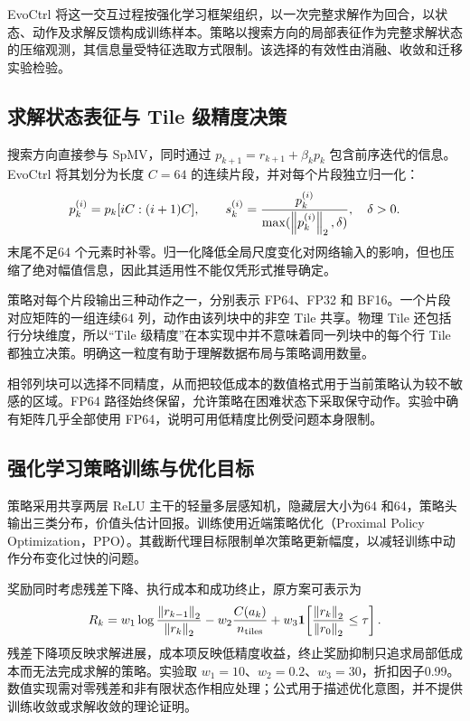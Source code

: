 EvoCtrl 将这一交互过程按强化学习框架组织，以一次完整求解作为回合，以状态、动作及求解反馈构成训练样本。策略以搜索方向的局部表征作为完整求解状态的压缩观测，其信息量受特征选取方式限制。该选择的有效性由消融、收敛和迁移实验检验。

\subsection{求解状态表征与 Tile 级精度决策}
搜索方向直接参与 SpMV，同时通过 $p_{k+1}=r_{k+1}+\beta_kp_k$ 包含前序迭代的信息。EvoCtrl 将其划分为长度 $C=64$ 的连续片段，并对每个片段独立归一化：
\begin{equation}
 p_k^{(i)}=p_k[iC:(i+1)C],\qquad
 s_k^{(i)}=\frac{p_k^{(i)}}{\max(\left\lVert p_k^{(i)}\right\rVert_2,\delta)},\quad\delta>0.
 \label{eq:evo-state}
\end{equation}
末尾不足64 个元素时补零。归一化降低全局尺度变化对网络输入的影响，但也压缩了绝对幅值信息，因此其适用性不能仅凭形式推导确定。

策略对每个片段输出三种动作之一，分别表示 FP64、FP32 和 BF16。一个片段对应矩阵的一组连续64 列，动作由该列块中的非空 Tile 共享。物理 Tile 还包括行分块维度，所以“Tile 级精度”在本实现中并不意味着同一列块中的每个行 Tile 都独立决策。明确这一粒度有助于理解数据布局与策略调用数量。

相邻列块可以选择不同精度，从而把较低成本的数值格式用于当前策略认为较不敏感的区域。FP64 路径始终保留，允许策略在困难状态下采取保守动作。实验中确有矩阵几乎全部使用 FP64，说明可用低精度比例受问题本身限制。

\subsection{强化学习策略训练与优化目标}
策略采用共享两层 ReLU 主干的轻量多层感知机，隐藏层大小为64 和64，策略头输出三类分布，价值头估计回报。训练使用近端策略优化（Proximal Policy Optimization，PPO）\cite{schulman2017}。其截断代理目标限制单次策略更新幅度，以减轻训练中动作分布变化过快的问题。

奖励同时考虑残差下降、执行成本和成功终止，原方案可表示为
\begin{equation}
 R_k=w_1\log\frac{\left\lVert r_{k-1}\right\rVert_2}{\left\lVert r_k\right\rVert_2}
 -w_2\frac{C(a_k)}{n_{\mathrm{tiles}}}
 +w_3\mathbf{1}\!\left[\frac{\left\lVert r_k\right\rVert_2}{\left\lVert r_0\right\rVert_2}\leq\tau\right].
 \label{eq:evo-reward}
\end{equation}
残差下降项反映求解进展，成本项反映低精度收益，终止奖励抑制只追求局部低成本而无法完成求解的策略。实验取 $w_1=10$、$w_2=0.2$、$w_3=30$，折扣因子0.99。数值实现需对零残差和非有限状态作相应处理；公式用于描述优化意图，并不提供训练收敛或求解收敛的理论证明。

